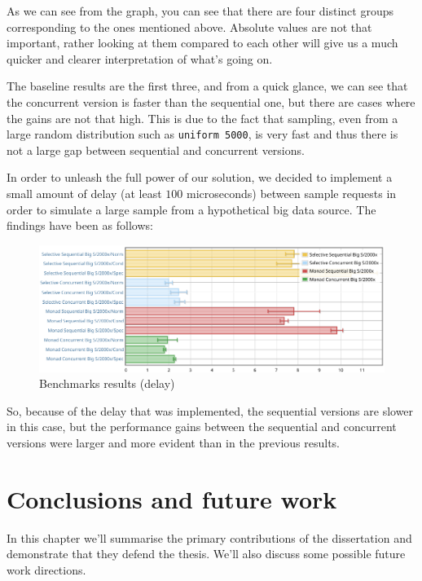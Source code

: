 \documentclass[
  oneside,
  11pt, a4paper,
  footinclude=true,
  headinclude=true,
  cleardoublepage=empty
]{scrbook}
\theoremstyle{definition}
\theoremstyle{definition}
\begin{document}
    As we can see from the graph, you can see that there are four distinct groups corresponding to the ones mentioned above. Absolute values are not that important, rather looking at them compared to each other will give us a much quicker and clearer interpretation of what's going on.
    
    The baseline results are the first three, and from a quick glance, we can see that the concurrent version is faster than the sequential one, but there are cases where the gains are not that high. This is due to the fact that sampling, even from a large random distribution such as \texttt{uniform 5000}, is very fast and thus there is not a large gap between sequential and concurrent versions.
    
    In order to unleash the full power of our solution, we decided to implement a small amount of delay (at least $100$ microseconds) between sample requests in order to simulate a large sample from a hypothetical big data source. The findings have been as follows:
    
    \begin{figure}[H]
        \centering
        \includegraphics{img/delay.pdf}
        \caption{Benchmarks results (delay)}
        \label{fig:delay}
    \end{figure}
    
    So, because of the delay that was implemented, the sequential versions are slower in this case, but the performance gains between the sequential and concurrent versions were larger and more evident than in the previous results.
        
	\chapter{Conclusions and future work}\label{ch-conclusion}
	    In this chapter we’ll summarise the primary contributions of the dissertation and demonstrate that they defend the thesis. We'll also discuss some possible future work directions.
	
\end{document}
